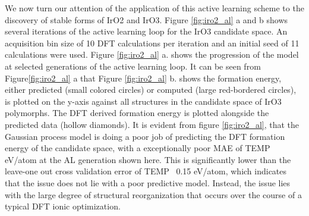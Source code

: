 %
%
We now turn our attention of the application of this active learning scheme to the discovery of stable forms of IrO2 and IrO3.
%
Figure \ref{fig:iro2_al} a and b shows several iterations of the active learning loop for the IrO3 candidate space. 
An acquisition bin size of 10 DFT calculations per iteration and an initial seed of 11 calculations were used.
%
Figure \ref{fig:iro2_al} a. shows the progression of the model at selected generations of the active learning loop.
%
It can be seen from Figure\ref{fig:iro2_al}  a that
%
Figure \ref{fig:iro2_al} b. shows the formation energy, either predicted (small colored circles) or computed (large red-bordered circles), is plotted on the y-axis against all structures in the candidate space of IrO3 polymorphs.
%
The DFT derived formation energy is plotted alongside the predicted data (hollow diamonds).
%
It is evident from figure \ref{fig:iro2_al}, that the Gaussian process model is doing a poor job of predicting the DFT formation energy of the candidate space, with a exceptionally poor MAE of TEMP eV/atom at the AL generation shown here.
%
This is significantly lower than the leave-one out cross validation error of TEMP ~0.15 eV/atom, which indicates that the issue does not lie with a poor predictive model.
%
Instead, the issue lies with the large degree of structural reorganization that occurs over the course of a typical DFT ionic optimization.


